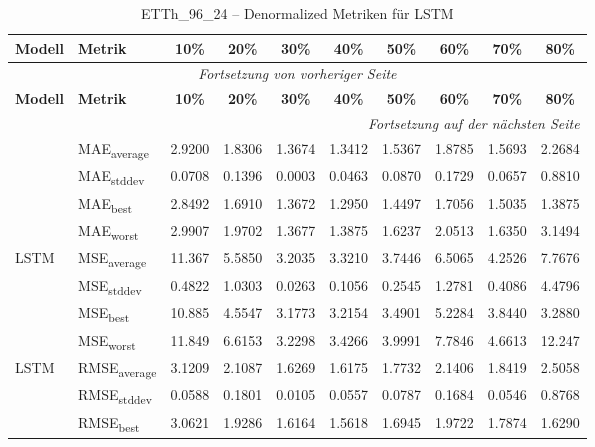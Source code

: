 {\small
\begin{longtable}{l l c c c c c c c c}
    \toprule
    \textbf{Modell} & \textbf{Metrik} & \textbf{10\%} & \textbf{20\%} & \textbf{30\%} & \textbf{40\%} & \textbf{50\%} & \textbf{60\%} & \textbf{70\%} & \textbf{80\%} \\
    \midrule
    \endfirsthead
    \multicolumn{10}{c}{\textit{Fortsetzung von vorheriger Seite}} \\
    \toprule
    \textbf{Modell} & \textbf{Metrik} & \textbf{10\%} & \textbf{20\%} & \textbf{30\%} & \textbf{40\%} & \textbf{50\%} & \textbf{60\%} & \textbf{70\%} & \textbf{80\%} \\
    \midrule
    \endhead
    \midrule
    \multicolumn{10}{r}{\textit{Fortsetzung auf der nächsten Seite}} \\
    \midrule
    \endfoot
    \bottomrule
    \caption{ETTh_96_24 -- Denormalized Metriken für LSTM}
    \label{tab:etth_96_24_denormalized_lstm}
    \endlastfoot
\multirow{4}{*}{LSTM} & MAE\textsubscript{average} & 2.9200 & 1.8306 & 1.3674 & 1.3412 & 1.5367 & 1.8785 & 1.5693 & 2.2684 \\
 & MAE\textsubscript{stddev} & 0.0708 & 0.1396 & 0.0003 & 0.0463 & 0.0870 & 0.1729 & 0.0657 & 0.8810 \\
 & MAE\textsubscript{best} & 2.8492 & 1.6910 & 1.3672 & 1.2950 & 1.4497 & 1.7056 & 1.5035 & 1.3875 \\
 & MAE\textsubscript{worst} & 2.9907 & 1.9702 & 1.3677 & 1.3875 & 1.6237 & 2.0513 & 1.6350 & 3.1494 \\
\cmidrule(lr){2-10}
\multirow{4}{*}{LSTM} & MSE\textsubscript{average} & 11.367 & 5.5850 & 3.2035 & 3.3210 & 3.7446 & 6.5065 & 4.2526 & 7.7676 \\
 & MSE\textsubscript{stddev} & 0.4822 & 1.0303 & 0.0263 & 0.1056 & 0.2545 & 1.2781 & 0.4086 & 4.4796 \\
 & MSE\textsubscript{best} & 10.885 & 4.5547 & 3.1773 & 3.2154 & 3.4901 & 5.2284 & 3.8440 & 3.2880 \\
 & MSE\textsubscript{worst} & 11.849 & 6.6153 & 3.2298 & 3.4266 & 3.9991 & 7.7846 & 4.6613 & 12.247 \\
\cmidrule(lr){2-10}
\multirow{4}{*}{LSTM} & RMSE\textsubscript{average} & 3.1209 & 2.1087 & 1.6269 & 1.6175 & 1.7732 & 2.1406 & 1.8419 & 2.5058 \\
 & RMSE\textsubscript{stddev} & 0.0588 & 0.1801 & 0.0105 & 0.0557 & 0.0787 & 0.1684 & 0.0546 & 0.8768 \\
 & RMSE\textsubscript{best} & 3.0621 & 1.9286 & 1.6164 & 1.5618 & 1.6945 & 1.9722 & 1.7874 & 1.6290 \\

\end{longtable}}
